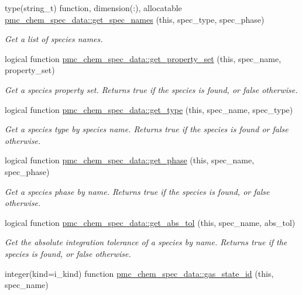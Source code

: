 \begin{DoxyCompactItemize}
type(string\+\_\+t) function, dimension(\+:), allocatable \mbox{\hyperlink{namespacepmc__chem__spec__data_aa41b3bc7544b5080624c9025768c3f3b}{pmc\+\_\+chem\+\_\+spec\+\_\+data\+::get\+\_\+spec\+\_\+names}} (this, spec\+\_\+type, spec\+\_\+phase)
\begin{DoxyCompactList}\small\item\em Get a list of species names. \end{DoxyCompactList}\item 
logical function \mbox{\hyperlink{namespacepmc__chem__spec__data_a046d71071a7e6a8511e9920d6aea8052}{pmc\+\_\+chem\+\_\+spec\+\_\+data\+::get\+\_\+property\+\_\+set}} (this, spec\+\_\+name, property\+\_\+set)
\begin{DoxyCompactList}\small\item\em Get a species property set. Returns true if the species is found, or false otherwise. \end{DoxyCompactList}\item 
logical function \mbox{\hyperlink{namespacepmc__chem__spec__data_a5a66d5eac7fdf70683cd8ffce529a45c}{pmc\+\_\+chem\+\_\+spec\+\_\+data\+::get\+\_\+type}} (this, spec\+\_\+name, spec\+\_\+type)
\begin{DoxyCompactList}\small\item\em Get a species type by species name. Returns true if the species is found or false otherwise. \end{DoxyCompactList}\item 
logical function \mbox{\hyperlink{namespacepmc__chem__spec__data_a2b05b142c1087393cf6504823601c8d5}{pmc\+\_\+chem\+\_\+spec\+\_\+data\+::get\+\_\+phase}} (this, spec\+\_\+name, spec\+\_\+phase)
\begin{DoxyCompactList}\small\item\em Get a species phase by name. Returns true if the species is found, or false otherwise. \end{DoxyCompactList}\item 
logical function \mbox{\hyperlink{namespacepmc__chem__spec__data_a671b3e9a1bfbb6be6cbbd775a3ac1cb1}{pmc\+\_\+chem\+\_\+spec\+\_\+data\+::get\+\_\+abs\+\_\+tol}} (this, spec\+\_\+name, abs\+\_\+tol)
\begin{DoxyCompactList}\small\item\em Get the absolute integration tolerance of a species by name. Returns true if the species is found, or false otherwise. \end{DoxyCompactList}\item 
integer(kind=i\+\_\+kind) function \mbox{\hyperlink{namespacepmc__chem__spec__data_a13c05c41c6d75707fc67de54acf5c783}{pmc\+\_\+chem\+\_\+spec\+\_\+data\+::gas\+\_\+state\+\_\+id}} (this, spec\+\_\+name)

\end{DoxyCompactItemize}
